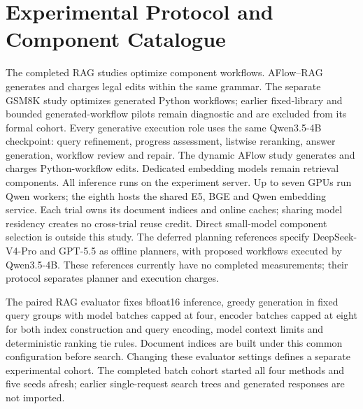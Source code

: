 \section{Experimental Protocol and Component Catalogue}
\label{app:experiments}
The completed RAG studies optimize component workflows. AFlow--RAG generates
and charges legal edits within the same grammar. The separate GSM8K study
optimizes generated Python workflows; earlier fixed-library and bounded
generated-workflow pilots remain diagnostic and are excluded from its formal cohort.
Every generative execution role uses the same Qwen3.5-4B checkpoint: query refinement,
progress assessment, listwise reranking, answer generation, workflow review
and repair. The dynamic AFlow study generates and charges Python-workflow edits.
Dedicated embedding models remain retrieval components. All inference runs on
the experiment server. Up to seven GPUs run Qwen workers; the eighth hosts the shared E5, BGE and Qwen
embedding service. Each trial owns its document indices and online caches;
sharing model residency creates no cross-trial reuse credit. Direct small-model component selection is
outside this study.
The deferred planning references specify DeepSeek-V4-Pro and GPT-5.5 as
offline planners, with proposed workflows executed by Qwen3.5-4B. These
references currently have no completed measurements; their protocol separates
planner and execution charges.

The paired RAG evaluator fixes bfloat16 inference, greedy generation in fixed
query groups with model batches capped at four, encoder batches capped at eight for both index construction and
query encoding, model context limits and deterministic ranking tie rules.
Document indices are built under this common configuration before search.
Changing these evaluator settings defines a separate experimental cohort.
The completed batch cohort started all four methods and five seeds afresh; earlier
single-request search trees and generated responses are not imported.

